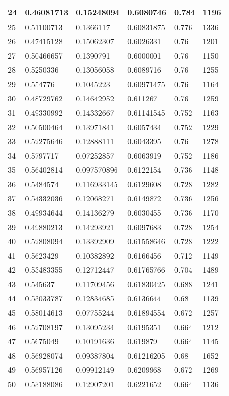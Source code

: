 \begin{longtable}{|l|l|l|l|l|l|}
24 & 0.46081713 & 0.15248094 & 0.6080746 & 0.784 & 1196 \\ \hline 
25 & 0.51100713 & 0.1366117 & 0.60831875 & 0.776 & 1336 \\ \hline 
26 & 0.47415128 & 0.15062307 & 0.6026331 & 0.76 & 1201 \\ \hline 
27 & 0.50466657 & 0.1390791 & 0.6000001 & 0.76 & 1150 \\ \hline 
28 & 0.5250336 & 0.13056058 & 0.6089716 & 0.76 & 1255 \\ \hline 
29 & 0.554776 & 0.1045223 & 0.60971475 & 0.76 & 1164 \\ \hline 
30 & 0.48729762 & 0.14642952 & 0.611267 & 0.76 & 1259 \\ \hline 
31 & 0.49330992 & 0.14332667 & 0.61141545 & 0.752 & 1163 \\ \hline 
32 & 0.50500464 & 0.13971841 & 0.6057434 & 0.752 & 1229 \\ \hline 
33 & 0.52275646 & 0.12888111 & 0.6043395 & 0.76 & 1278 \\ \hline 
34 & 0.5797717 & 0.07252857 & 0.6063919 & 0.752 & 1186 \\ \hline 
35 & 0.56402814 & 0.097570896 & 0.6122154 & 0.736 & 1148 \\ \hline 
36 & 0.5484574 & 0.116933145 & 0.6129608 & 0.728 & 1282 \\ \hline 
37 & 0.54332036 & 0.12068271 & 0.6149872 & 0.736 & 1256 \\ \hline 
38 & 0.49934644 & 0.14136279 & 0.6030455 & 0.736 & 1170 \\ \hline 
39 & 0.49880213 & 0.14293921 & 0.6097683 & 0.728 & 1254 \\ \hline 
40 & 0.52808094 & 0.13392909 & 0.61558646 & 0.728 & 1222 \\ \hline 
41 & 0.5623429 & 0.10382892 & 0.6166456 & 0.712 & 1149 \\ \hline 
42 & 0.53483355 & 0.12712447 & 0.61765766 & 0.704 & 1489 \\ \hline 
43 & 0.545637 & 0.11709456 & 0.61830425 & 0.688 & 1241 \\ \hline 
44 & 0.53033787 & 0.12834685 & 0.6136644 & 0.68 & 1139 \\ \hline 
45 & 0.58014613 & 0.07755244 & 0.61894554 & 0.672 & 1257 \\ \hline 
46 & 0.52708197 & 0.13095234 & 0.6195351 & 0.664 & 1212 \\ \hline 
47 & 0.5675049 & 0.10191636 & 0.619879 & 0.664 & 1145 \\ \hline 
48 & 0.56928074 & 0.09387804 & 0.61216205 & 0.68 & 1652 \\ \hline 
49 & 0.56957126 & 0.09912149 & 0.6209968 & 0.672 & 1269 \\ \hline 
50 & 0.53188086 & 0.12907201 & 0.6221652 & 0.664 & 1136 \\ \hline 
\end{longtable}